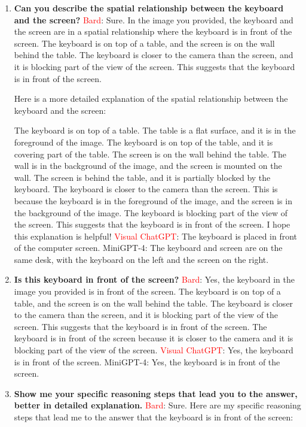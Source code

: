 \begin{enumerate}
    \item \textbf{Can you describe the spatial relationship between the keyboard and the screen?}
    \subitem \textcolor{Red}{Bard}: Sure. In the image you provided, the keyboard and the screen are in a spatial relationship where the keyboard is in front of the screen. The keyboard is on top of a table, and the screen is on the wall behind the table. The keyboard is closer to the camera than the screen, and it is blocking part of the view of the screen. This suggests that the keyboard is in front of the screen.

    Here is a more detailed explanation of the spatial relationship between the keyboard and the screen:
    
    The keyboard is on top of a table. The table is a flat surface, and it is in the foreground of the image. The keyboard is on top of the table, and it is covering part of the table.
    The screen is on the wall behind the table. The wall is in the background of the image, and the screen is mounted on the wall. The screen is behind the table, and it is partially blocked by the keyboard.
    The keyboard is closer to the camera than the screen. This is because the keyboard is in the foreground of the image, and the screen is in the background of the image.
    The keyboard is blocking part of the view of the screen. This suggests that the keyboard is in front of the screen.
    I hope this explanation is helpful!
    \subitem \textcolor{red}{Visual ChatGPT}: The keyboard is placed in front of the computer screen.
    \subitem MiniGPT-4: The keyboard and screen are on the same desk, with the keyboard on the left and the screen on the right.
    \item \textbf{Is this keyboard in front of the screen?}
    \subitem \textcolor{Red}{Bard}: Yes, the keyboard in the image you provided is in front of the screen. The keyboard is on top of a table, and the screen is on the wall behind the table. The keyboard is closer to the camera than the screen, and it is blocking part of the view of the screen. This suggests that the keyboard is in front of the screen. The keyboard is in front of the screen because it is closer to the camera and it is blocking part of the view of the screen.
    \subitem \textcolor{red}{Visual ChatGPT}: Yes, the keyboard is in front of the screen.
    \subitem MiniGPT-4: Yes, the keyboard is in front of the screen.
    \item \textbf{Show me your specific reasoning steps that lead you to the answer, better in detailed explanation.}
    \subitem \textcolor{Red}{Bard}: 
    Sure. Here are my specific reasoning steps that lead me to the answer that the keyboard is in front of the screen:
    

\end{enumerate}
